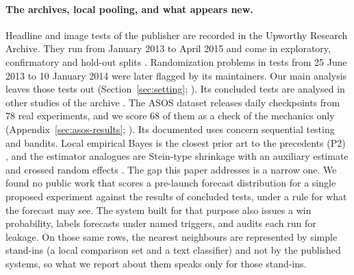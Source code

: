 \paragraph{The archives, local pooling, and what appears new.}
Headline and image tests of the publisher are recorded in the Upworthy Research Archive. They run from January 2013 to April 2015 and come in exploratory, confirmatory and hold-out splits \cite{matias2021upworthy}.
Randomization problems in tests from 25 June 2013 to 10 January 2014 were later flagged by its maintainers. Our main analysis leaves those tests out (Section~\ref{sec:setting}; \cite{upworthy2024notice}). Its concluded tests are analysed in other studies of the archive \cite{banerjee2025language,robertson2023negativity,ottaviani2024testing}.
The ASOS dataset releases daily checkpoints from 78 real experiments, and we score 68 of them as a check of the mechanics only (Appendix~\ref{sec:asos-results}; \cite{liu2021datasets,liu2024statistical}). Its documented uses \cite{che2024optimization,kim2026odds} concern sequential testing and bandits. Local empirical Bayes is the closest prior art to the precedents (P2) \cite{li2025learning}, and the estimator analogues are Stein-type shrinkage with an auxiliary estimate \cite{rosenman2020combining} and crossed random effects \cite{baayen2008mixed}. The gap this paper addresses is a narrow one. We found no public work that scores a pre-launch forecast distribution for a single proposed experiment against the results of concluded tests, under a rule for what the forecast may see. The system built for that purpose also issues a win probability, labels forecasts under named triggers, and audits each run for leakage. On those same rows, the nearest neighbours \cite{li2025learning,ye2025lola,clark2026predict,khimani2026finetuning} are represented by simple stand-ins (a local comparison set and a text classifier) and not by the published systems, so what we report about them speaks only for those stand-ins.
